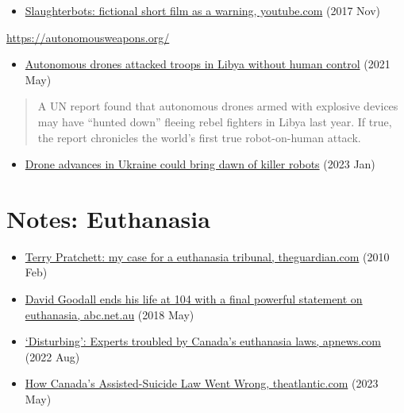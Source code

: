 \begin{itemize}
\tightlist
\item
  \href{https://www.youtube.com/watch?v=HipTO_7mUOw}{Slaughterbots:
  fictional short film as a warning, youtube.com} (2017 Nov)
\end{itemize}

\url{https://autonomousweapons.org/}

\begin{itemize}
\tightlist
\item
  \href{https://www.rt.com/news/525111-libya-killer-drone-attack/}{Autonomous
  drones attacked troops in Libya without human control} (2021 May)
\end{itemize}

\begin{quote}
A UN report found that autonomous drones armed with explosive devices
may have ``hunted down'' fleeing rebel fighters in Libya last year. If
true, the report chronicles the world's first true robot-on-human
attack.
\end{quote}

\begin{itemize}
\tightlist
\item
  \href{https://apnews.com/article/russia-ukraine-war-drone-advances-6591dc69a4bf2081dcdd265e1c986203}{Drone
  advances in Ukraine could bring dawn of killer robots} (2023 Jan)
\end{itemize}

\section{Notes: Euthanasia}

\begin{itemize}
\item
  \href{https://www.theguardian.com/society/2010/feb/02/terry-pratchett-assisted-suicide-tribunal}{Terry
  Pratchett: my case for a euthanasia tribunal, theguardian.com} (2010
  Feb)
\item
  \href{https://www.abc.net.au/news/2018-05-10/david-goodall-ends-life-in-a-powerful-statement-on-euthanasia/9742528}{David
  Goodall ends his life at 104 with a final powerful statement on
  euthanasia, abc.net.au} (2018 May)
\item
  \href{https://apnews.com/article/covid-science-health-toronto-7c631558a457188d2bd2b5cfd360a867}{`Disturbing':
  Experts troubled by Canada's euthanasia laws, apnews.com} (2022 Aug)
\item
  \href{https://www.theatlantic.com/magazine/archive/2023/06/canada-legalized-medical-assisted-suicide-euthanasia-death-maid/673790/}{How
  Canada's Assisted-Suicide Law Went Wrong, theatlantic.com} (2023 May)
\end{itemize}

